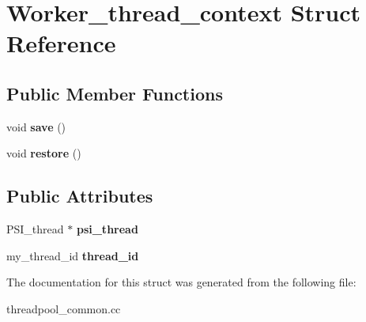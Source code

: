 \hypertarget{structWorker__thread__context}{}\section{Worker\+\_\+thread\+\_\+context Struct Reference}
\label{structWorker__thread__context}
\subsection*{Public Member Functions}
\begin{DoxyCompactItemize}
\item 
\mbox{\label{structWorker__thread__context_a6dcd356a1219c83a6f0f601f2fd94718}} 
void {\bfseries save} ()
\item 
\mbox{\label{structWorker__thread__context_ad54ee275d60e46588ba34bff875b51f3}} 
void {\bfseries restore} ()
\end{DoxyCompactItemize}
\subsection*{Public Attributes}
\begin{DoxyCompactItemize}
\item 
\mbox{\label{structWorker__thread__context_ab544ce0a5c6419b91e97984f3a8fcd41}} 
P\+S\+I\+\_\+thread $\ast$ {\bfseries psi\+\_\+thread}
\item 
\mbox{\label{structWorker__thread__context_ada20e8b06c5dd11c16b32c346708e2f6}} 
my\+\_\+thread\+\_\+id {\bfseries thread\+\_\+id}
\end{DoxyCompactItemize}


The documentation for this struct was generated from the following file\+:\begin{DoxyCompactItemize}
\item 
threadpool\+\_\+common.\+cc\end{DoxyCompactItemize}
